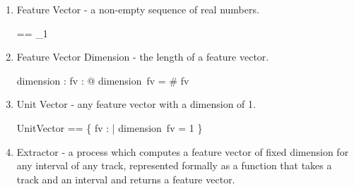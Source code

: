 \documentclass[11pt]{article}
\begin{document}
\begin{enumerate}
\item \textsf{Feature Vector} - a non-empty sequence of real numbers.

\begin{zed}
	\FV == \seq_1 \R 
\end{zed}



\newcommand{\Vdsl}{\mathrel{~FV^{d * sl}}}


\newcommand{\Vd}{\mathrel{~FV^{d}}}


\newcommand{\Z}{\mathrel{~FV^{1}}}


\newcommand{\Vsl}{\mathrel{~FV^{sl}}}



\item \textsf{Feature Vector Dimension} - the length of a feature vector. 

\begin{axdef}
	dimension : \FV \fun \nat
\where
	\forall fv : \FV @ dimension~fv = \# fv
\end{axdef}

\item \textsf{Unit Vector} - any feature vector with a dimension of 1.

\begin{zed}
	UnitVector == \{ fv : \FV | dimension~fv = 1 \}
\end{zed}

\item \textsf{Extractor} - a  process which computes a feature vector of fixed dimension for any interval of any track, represented formally as a function that takes a track and an interval and returns a feature vector.


\end{enumerate}
\end{document}
